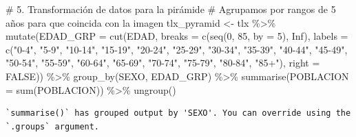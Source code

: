 \documentclass[
  letterpaper,
  DIV=11,
  numbers=noendperiod]{scrartcl}
\newenvironment{Shaded}{\begin{snugshade}}{\end{snugshade}}
\newcommand{\AttributeTok}[1]{\textcolor[rgb]{0.40,0.45,0.13}{#1}}
\newcommand{\CommentTok}[1]{\textcolor[rgb]{0.37,0.37,0.37}{#1}}
\newcommand{\ConstantTok}[1]{\textcolor[rgb]{0.56,0.35,0.01}{#1}}
\newcommand{\DecValTok}[1]{\textcolor[rgb]{0.68,0.00,0.00}{#1}}
\newcommand{\FunctionTok}[1]{\textcolor[rgb]{0.28,0.35,0.67}{#1}}
\newcommand{\NormalTok}[1]{\textcolor[rgb]{0.00,0.23,0.31}{#1}}
\newcommand{\OtherTok}[1]{\textcolor[rgb]{0.00,0.23,0.31}{#1}}
\newcommand{\SpecialCharTok}[1]{\textcolor[rgb]{0.37,0.37,0.37}{#1}}
\newcommand{\StringTok}[1]{\textcolor[rgb]{0.13,0.47,0.30}{#1}}
\begin{document}
\begin{Shaded}
\begin{Highlighting}[]
\CommentTok{\# 5. Transformación de datos para la pirámide}
\CommentTok{\# Agrupamos por rangos de 5 años para que coincida con la imagen}
\NormalTok{tlx\_pyramid }\OtherTok{\textless{}{-}}\NormalTok{ tlx }\SpecialCharTok{\%\textgreater{}\%}
  \FunctionTok{mutate}\NormalTok{(}\AttributeTok{EDAD\_GRP =} \FunctionTok{cut}\NormalTok{(EDAD, }
                        \AttributeTok{breaks =} \FunctionTok{c}\NormalTok{(}\FunctionTok{seq}\NormalTok{(}\DecValTok{0}\NormalTok{, }\DecValTok{85}\NormalTok{, }\AttributeTok{by =} \DecValTok{5}\NormalTok{), }\ConstantTok{Inf}\NormalTok{), }
                        \AttributeTok{labels =} \FunctionTok{c}\NormalTok{(}\StringTok{"0{-}4"}\NormalTok{, }\StringTok{"5{-}9"}\NormalTok{, }\StringTok{"10{-}14"}\NormalTok{, }\StringTok{"15{-}19"}\NormalTok{, }\StringTok{"20{-}24"}\NormalTok{, }\StringTok{"25{-}29"}\NormalTok{, }
                                   \StringTok{"30{-}34"}\NormalTok{, }\StringTok{"35{-}39"}\NormalTok{, }\StringTok{"40{-}44"}\NormalTok{, }\StringTok{"45{-}49"}\NormalTok{, }\StringTok{"50{-}54"}\NormalTok{, }\StringTok{"55{-}59"}\NormalTok{, }
                                   \StringTok{"60{-}64"}\NormalTok{, }\StringTok{"65{-}69"}\NormalTok{, }\StringTok{"70{-}74"}\NormalTok{, }\StringTok{"75{-}79"}\NormalTok{, }\StringTok{"80{-}84"}\NormalTok{, }\StringTok{"85+"}\NormalTok{), }
                        \AttributeTok{right =} \ConstantTok{FALSE}\NormalTok{)) }\SpecialCharTok{\%\textgreater{}\%}
  \FunctionTok{group\_by}\NormalTok{(SEXO, EDAD\_GRP) }\SpecialCharTok{\%\textgreater{}\%}
  \FunctionTok{summarise}\NormalTok{(}\AttributeTok{POBLACION =} \FunctionTok{sum}\NormalTok{(POBLACION)) }\SpecialCharTok{\%\textgreater{}\%}
  \FunctionTok{ungroup}\NormalTok{()}
\end{Highlighting}
\end{Shaded}

\begin{verbatim}
`summarise()` has grouped output by 'SEXO'. You can override using the
`.groups` argument.
\end{verbatim}
\end{document}
